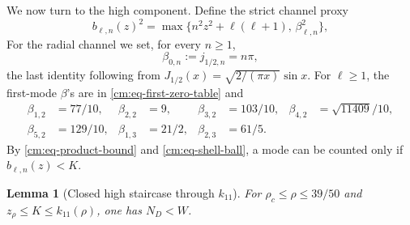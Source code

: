 \documentclass[11pt]{article}
\numberwithin{equation}{section}
\newtheorem{lemma}[theorem]{Lemma}
\theoremstyle{definition}
\theoremstyle{remark}
\begin{document}
We now turn to the high component.  Define the strict channel proxy
\begin{equation}
 b_{\ell,n}(z)^2=
 \max\{n^2z^2+\ell(\ell+1),\,\beta_{\ell,n}^2\},
 \label{cm:eq-channel-proxy}
\end{equation}
For the radial channel we set, for every \(n\geq1\),
\[
 \beta_{0,n}:=j_{1/2,n}=n\pi,
\]
the last identity following from
\(J_{1/2}(x)=\sqrt{2/(\pi x)}\sin x\).  For \(\ell\geq1\), the
first-mode \(\beta\)'s are in
\eqref{cm:eq-first-zero-table} and
\[
\begin{aligned}
 \beta_{1,2}&=77/10,&
 \beta_{2,2}&=9,&
 \beta_{3,2}&=103/10,&
 \beta_{4,2}&=\sqrt{11409}/10,\\
 \beta_{5,2}&=129/10,&
 \beta_{1,3}&=21/2,&
 \beta_{2,3}&=61/5.
\end{aligned}
\]
By \eqref{cm:eq-product-bound} and \eqref{cm:eq-shell-ball}, a mode can
be counted only if \(b_{\ell,n}(z)<K\).

\begin{lemma}[Closed high staircase through \(k_{11}\)]
\label{cm:lem-k11}
For \(\rho_c\leq\rho\leq39/50\) and
\(z_\rho\leq K\leq k_{11}(\rho)\), one has \(N_D<W\).
\end{lemma}
\end{document}
